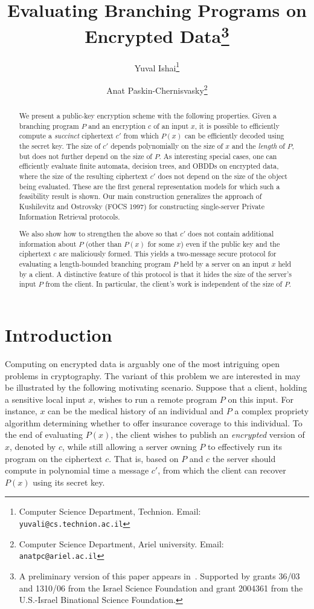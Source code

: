 \documentclass[11pt]{article}
\title{Evaluating Branching Programs on Encrypted Data\thanks{A
preliminary version of this paper appears in~\cite{IP07}. Supported
by grants 36/03 and 1310/06 from the Israel Science Foundation and
     grant 2004361 from the U.S.-Israel Binational Science
     Foundation.}}
\author{ Yuval Ishai\thanks{Computer Science Department, Technion.
Email: {\tt yuvali@cs.technion.ac.il}} \and Anat Paskin-Chernisvasky\thanks{
Computer Science Department, Ariel university. Email: {\tt
anatpc@ariel.ac.il}}}
\begin{document}
\maketitle
\begin{abstract}

We present a public-key encryption scheme with the following
properties. Given a branching program $P$ and an encryption $c$ of
an input $x$, it is possible to efficiently compute a {\em succinct}
ciphertext $c'$ from which $P(x)$ can be efficiently decoded using
the secret key. The size of $c'$ depends polynomially on the size of
$x$ and the {\em length} of $P$, but does not further depend on the
size of $P$. As interesting special cases, one can efficiently
evaluate finite automata, decision trees, and OBDDs on encrypted
data, where the size of the resulting ciphertext $c'$ does not
depend on the size of the object being evaluated. These are the
first general representation models for which such a feasibility
result is shown. Our main construction generalizes the approach of
Kushilevitz and Ostrovsky (FOCS 1997) for constructing single-server
Private Information Retrieval protocols.

We also show how to strengthen the above so that $c'$ does not
contain additional information about $P$ (other than $P(x)$ for some
$x$) even if the public key and the ciphertext $c$ are maliciously
formed. This yields a two-message secure protocol for evaluating a
length-bounded branching program $P$ held by a server on an input
$x$ held by a client. A distinctive feature of this protocol is that
it hides the size of the server's input $P$ from the client. In
particular, the client's work is independent of the size of $P$.


\end{abstract}



\section{Introduction}
Computing on encrypted data is arguably one of the most intriguing
open problems in cryptography. The variant of this problem we are
interested in may be illustrated by the following motivating
scenario. Suppose that a client, holding a sensitive local input
$x$, wishes to run a remote program $P$ on this input. For
instance, $x$ can be the medical history of an individual and $P$ a
complex propriety algorithm determining whether to offer insurance
coverage to this individual. To the end of evaluating $P(x)$, the
client wishes to publish an {\em encrypted} version of $x$, denoted
by $c$, while still allowing a server owning $P$ to effectively run
its program on the ciphertext $c$. That is, based on $P$ and $c$
the server should compute in polynomial time a message $c'$, from
which the client can recover $P(x)$ using its secret key.
\end{document}
